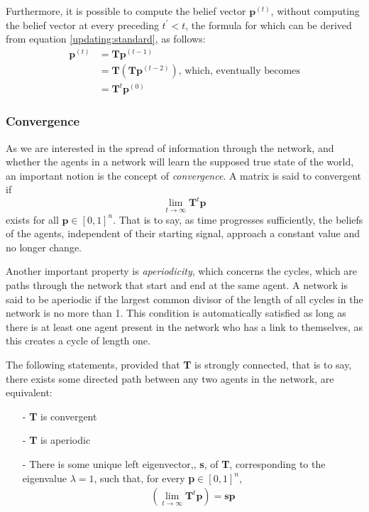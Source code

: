 \documentclass{article}
\begin{document}
Furthermore, it is possible to compute the belief vector $\textbf{p}^{(t)}$, without computing the belief vector at every preceding $t^\prime < t$, the formula for which can be derived from equation \ref{updating:standard}, as follows:
\begin{align*}
    \textbf{p}^{(t)} &= \textbf{T}\textbf{p}^{(t-1)} \\
    &= \textbf{T}(\textbf{T}\textbf{p}^{(t-2)}) \text{, which, eventually becomes}\\
    &= \textbf{T}^{t}\textbf{p}^{(0)}
\end{align*}

\newpage

\subsubsection{Convergence}
As we are interested in the spread of information through the network, and whether the agents in a network will learn the supposed true state of the world, an important notion is the concept of \emph{convergence}. A matrix  is said to convergent if
\begin{equation*}
    \lim_{t\to\infty} \textbf{T}^t\textbf{p}
\end{equation*}
exists for all $\textbf{p} \in [0, 1]^n$. That is to say, as time progresses sufficiently, the beliefs of the agents, independent of their starting signal, approach a constant value and no longer change.

Another important property is \emph{aperiodicity}, which concerns the cycles, which are paths through the network that start and end at the same agent. A network is said to be aperiodic if the largest common divisor of the length of all cycles in the network is no more than 1. This condition is automatically satisfied as long as there is at least one agent present in the network who has a link to themselves, as this creates a cycle of length one.

The following statements, provided that \textbf{T} is strongly connected, that is to say, there exists some directed path between any two agents in the network,  are equivalent:
\begin{itemize}
    \item[-] \textbf{T} is convergent
    \item[-] \textbf{T} is aperiodic
    \item[-] There is some unique left eigenvector,, \textbf{s}, of \textbf{T}, corresponding to the eigenvalue $\lambda=1$, such that, for every \textbf{p}$\in [0,1]^n$,
    \begin{align*}
        (\lim_{t\to\infty}\textbf{T}^t\textbf{p}) = \textbf{sp}
    \end{align*}
\end{itemize}


\end{document}
